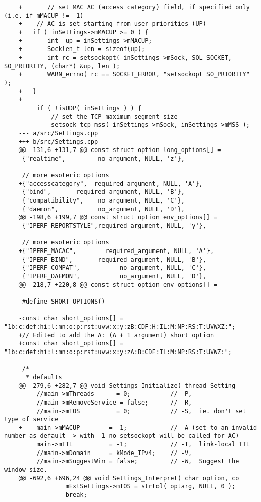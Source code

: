 \begin{lstlisting}
    +   	// set MAC AC (access category) field, if specified only (i.e. if mMACUP != -1)
    +    // AC is set starting from user priorities (UP)
    +	if ( inSettings->mMACUP >= 0 ) {
    +		int  up = inSettings->mMACUP;
    +		Socklen_t len = sizeof(up);
    +		int rc = setsockopt( inSettings->mSock, SOL_SOCKET, SO_PRIORITY, (char*) &up, len );
    +		WARN_errno( rc == SOCKET_ERROR, "setsockopt SO_PRIORITY" );
    +	}
    +
         if ( !isUDP( inSettings ) ) {
             // set the TCP maximum segment size
             setsock_tcp_mss( inSettings->mSock, inSettings->mMSS );
    --- a/src/Settings.cpp
    +++ b/src/Settings.cpp
    @@ -131,6 +131,7 @@ const struct option long_options[] =
     {"realtime",         no_argument, NULL, 'z'},
     
     // more esoteric options
    +{"accesscategory",  required_argument, NULL, 'A'},
     {"bind",       required_argument, NULL, 'B'},
     {"compatibility",    no_argument, NULL, 'C'},
     {"daemon",           no_argument, NULL, 'D'},
    @@ -198,6 +199,7 @@ const struct option env_options[] =
     {"IPERF_REPORTSTYLE",required_argument, NULL, 'y'},
     
     // more esoteric options
    +{"IPERF_MACAC",        required_argument, NULL, 'A'},
     {"IPERF_BIND",       required_argument, NULL, 'B'},
     {"IPERF_COMPAT",           no_argument, NULL, 'C'},
     {"IPERF_DAEMON",           no_argument, NULL, 'D'},
    @@ -218,7 +220,8 @@ const struct option env_options[] =
     
     #define SHORT_OPTIONS()
     
    -const char short_options[] = "1b:c:def:hi:l:mn:o:p:rst:uvw:x:y:zB:CDF:H:IL:M:NP:RS:T:UVWXZ:";
    +// Edited to add the A: (A + 1 argument) short option
    +const char short_options[] = "1b:c:def:hi:l:mn:o:p:rst:uvw:x:y:zA:B:CDF:IL:M:NP:RS:T:UVWZ:";
     
     /* ------------------------------------------------------
      * defaults
    @@ -279,6 +282,7 @@ void Settings_Initialize( thread_Setting
         //main->mThreads      = 0;           // -P,
         //main->mRemoveService = false;      // -R,
         //main->mTOS          = 0;           // -S,  ie. don't set type of service
    +    main->mMACUP        = -1;            // -A (set to an invalid number as default -> with -1 no setsockopt will be called for AC)
         main->mTTL          = -1;            // -T,  link-local TTL
         //main->mDomain     = kMode_IPv4;    // -V,
         //main->mSuggestWin = false;         // -W,  Suggest the window size.
    @@ -692,6 +696,24 @@ void Settings_Interpret( char option, co
                 mExtSettings->mTOS = strtol( optarg, NULL, 0 );
                 break;
     

\end{lstlisting}
